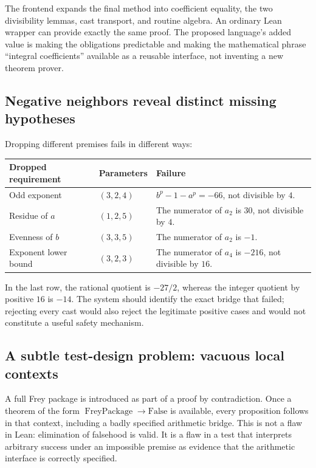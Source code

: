 \documentclass[11pt,a4paper]{article}
\theoremstyle{plain}\newtheorem{proposition}{Proposition}[section]
\theoremstyle{definition}\newtheorem{definition}[proposition]{Definition}
\theoremstyle{remark}\newtheorem{remark}[proposition]{Remark}
\begin{document}
The frontend expands the final method into coefficient equality, the two divisibility lemmas, cast transport, and routine algebra. An ordinary Lean wrapper can provide exactly the same proof. The proposed language's added value is making the obligations predictable and making the mathematical phrase ``integral coefficients'' available as a reusable interface, not inventing a new theorem prover.

\subsection{Negative neighbors reveal distinct missing hypotheses}
Dropping different premises fails in different ways:
\begin{center}\small
\begin{tabularx}{\textwidth}{@{}P{.27\textwidth}P{.22\textwidth}Y@{}}
\toprule
Dropped requirement & Parameters & Failure\\
\midrule
Odd exponent & \((3,2,4)\) & \(b^p-1-a^p=-66\), not divisible by \(4\).\\
Residue of \(a\) & \((1,2,5)\) & The numerator of \(a_2\) is \(30\), not divisible by \(4\).\\
Evenness of \(b\) & \((3,3,5)\) & The numerator of \(a_2\) is \(-1\).\\
Exponent lower bound & \((3,2,3)\) & The numerator of \(a_4\) is \(-216\), not divisible by \(16\).\\
\bottomrule
\end{tabularx}
\end{center}
In the last row, the rational quotient is \(-27/2\), whereas the integer quotient by positive \(16\) is \(-14\). The system should identify the exact bridge that failed; rejecting every cast would also reject the legitimate positive cases and would not constitute a useful safety mechanism.

\subsection{A subtle test-design problem: vacuous local contexts}\label{sec:vacuity}
A full Frey package is introduced as part of a proof by contradiction. Once a theorem of the form \(\operatorname{FreyPackage}\to\mathrm{False}\) is available, every proposition follows in that context, including a badly specified arithmetic bridge. This is not a flaw in Lean: elimination of falsehood is valid. It is a flaw in a test that interprets arbitrary success under an impossible premise as evidence that the arithmetic interface is correctly specified.
\end{document}
